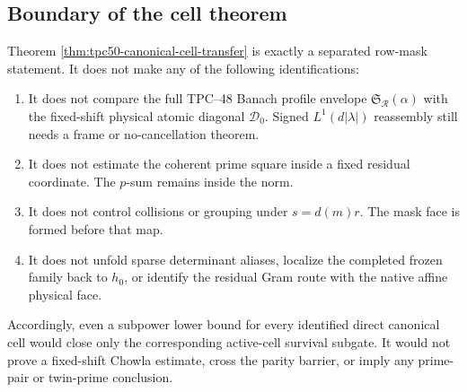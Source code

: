 \subsection{Boundary of the cell theorem}

Theorem \ref{thm:tpc50-canonical-cell-transfer} is exactly a separated
row-mask statement.  It does not make any of the following
identifications:
\begin{enumerate}[label=\textup{(\roman*)},leftmargin=2.4em]
 \item It does not compare the full TPC--48 Banach profile envelope
       \(\mathfrak S_{\mathscr R}(\alpha)\) with the fixed-shift physical
       atomic diagonal \(\mathcal D_0\).  Signed
       \(L^1(d|\lambda|)\) reassembly still needs a frame or
       no-cancellation theorem.
 \item It does not estimate the coherent prime square inside a fixed
       residual coordinate.  The \(p\)-sum remains inside the norm.
 \item It does not control collisions or grouping under
       \(s=d(m)r\).  The mask face is formed before that map.
 \item It does not unfold sparse determinant aliases, localize the
       completed frozen family back to \(h_0\), or identify the residual
       Gram route with the native affine physical face.
\end{enumerate}
Accordingly, even a subpower lower bound for every identified direct
canonical cell would close only the corresponding active-cell survival
subgate.  It would not prove a
fixed-shift Chowla estimate, cross the parity barrier, or imply any
prime-pair or twin-prime conclusion.
